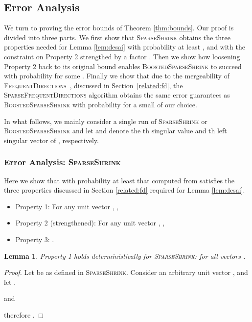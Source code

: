 \documentclass[11pt]{article}
\newcommand{\fd}{\textsc{FrequentDirections}\xspace}
\newcommand{\sfd}{\textsc{SparseFrequentDirections}\xspace}
\newcommand{\SSh}{\textsc{SparseShrink}\xspace}
\newcommand{\BSSh}{\textsc{BoostedSparseShrink}\xspace}
\newtheorem{lemma}{Lemma}[section]
\newcommand{\denselist}{\itemsep -2pt\parsep=-1pt\partopsep -2pt}
\begin{document}
\subsection{Error Analysis}
\label{sec:error}

We turn to proving the error bounds of Theorem \ref{thm:bounds}.  
Our proof is divided into three parts.  
We first show that \SSh obtains the three properties needed for Lemma \ref{lem:desai} with probability at least , and with the constraint on Property 2 strengthed by a factor .
Then we show how loosening Property 2 back to its original bound enables \BSSh to succeed with probability  for some . 
Finally we show that due to the mergeability of \fd~\cite{Lib12}, discussed in Section~\ref{related:fd}, the \sfd algorithm obtains the same error guarantees as \BSSh with probability  for a small  of our choice. 


In what follows, we mainly consider a single run of \SSh or \BSSh and let  and  denote the th singular value and th left singular vector of , respectively.

\subsubsection{Error Analysis: \SSh} 

Here we show that with probability at least  that  computed from  satisfies the three properties discussed in Section \ref{related:fd} required for Lemma \ref{lem:desai}.  
\begin{itemize} \denselist
\item Property 1: For any unit vector , ,
\item Property 2 (strengthened): For any unit vector , , 
\item Property 3: .
\end{itemize}


\label{subsub:SSh}
\begin{lemma} 
Property 1 holds deterministically for \SSh:  for all vectors .
\end{lemma}
\begin{proof}
Let  be as defined in \SSh. Consider an arbitrary unit vector , and let .

and 

therefore .
\end{proof}
\end{document}
